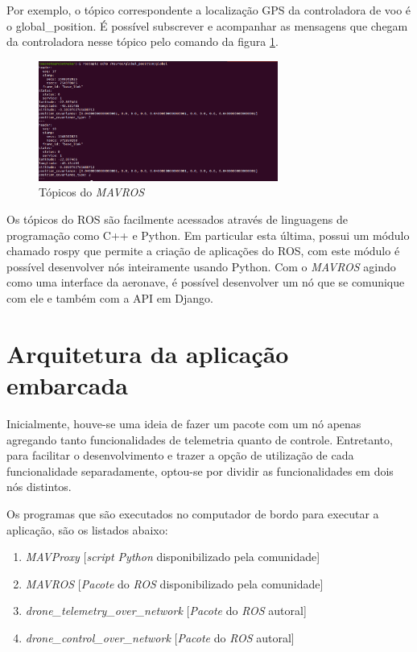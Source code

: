 \documentclass[12pt,a4paper,oneside]{book}
\begin{document}
%
Por exemplo, o tópico correspondente a localização GPS da controladora de voo é o global\_position. É possível subscrever e acompanhar as mensagens que chegam da controladora nesse tópico pelo comando da figura \ref{fig:mavros_rostopic_echo.png.0}.
%
\begin{figure}[H]
  \centering
  \includegraphics[width=0.7\textwidth]{Images/Desenvolvimento/mavros_rostopic_echo.png}
  \caption{Tópicos do \textit{MAVROS}}
  \label{fig:mavros_rostopic_echo.png.0}
\end{figure}
%

Os tópicos do ROS são facilmente acessados através de linguagens de programação como C++ e Python. Em particular esta última, possui um módulo chamado rospy que permite a criação de aplicações do ROS, com este módulo é possível desenvolver nós inteiramente usando Python. Com o \textit{MAVROS} agindo como uma interface da aeronave, é possível desenvolver um nó que se comunique com ele e também com a API em Django.

\section{Arquitetura da aplicação embarcada}

Inicialmente, houve-se uma ideia de fazer um pacote com um nó apenas agregando tanto funcionalidades de telemetria quanto de controle. Entretanto, para facilitar o desenvolvimento e trazer a opção de utilização de cada funcionalidade separadamente, optou-se por dividir as funcionalidades em dois nós distintos.  

Os programas que são executados no computador de bordo para executar a aplicação, são os listados abaixo: 
\begin{enumerate}
  \item \textit{MAVProxy} [\textit{script Python} disponibilizado pela comunidade]
  \item \textit{MAVROS} [\textit{Pacote} do \textit{ROS} disponibilizado pela comunidade]
  \item \textit{drone\_telemetry\_over\_network} [\textit{Pacote} do \textit{ROS} autoral]
  \item \textit{drone\_control\_over\_network} [\textit{Pacote} do \textit{ROS} autoral]
\end{enumerate}
\end{document}

